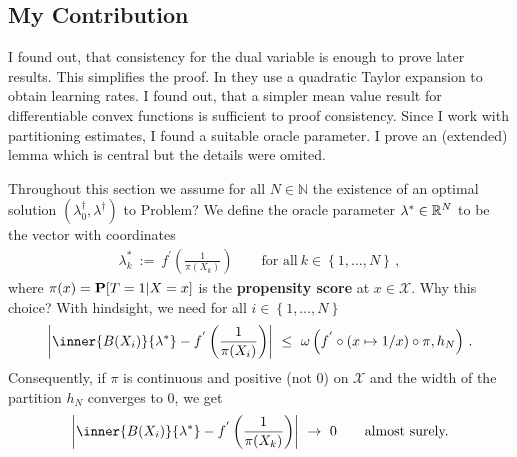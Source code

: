 \subsection*{My Contribution}
I found out, that consistency for the dual variable is enough to prove later results. This simplifies the proof. 
In \cite{Wang2019} they use a quadratic Taylor expansion to obtain learning rates. I found out, that a simpler mean value result for differentiable convex functions is sufficient to proof consistency. 
Since I work with partitioning estimates, I found a suitable oracle parameter.
I prove an (extended) lemma which is central but the details were omited.

Throughout this section we assume for all $N\in\mathbb{N}$ the existence of an 
optimal solution 
$(\lambda_0^\dagger,\lambda^\dagger)$
to Problem?
We define the oracle parameter $\lambda^*\in\R^N$ to be the vector with coordinates
\begin{gather}
  \label{oracle_1}
  \lambda^*_k
  \ 
  :=
  \ 
  f^{'}
  \left( 
    \frac{1}{\pi(X_k)}
  \right)
  \qquad
  \text{for all}\ 
  k\in \left\{ 1,\ldots,N \right\}
  \,,
\end{gather}
where $\pi(x)=\P[T=1|X=x]$ is the \textbf{propensity score} at $x\in\mathcal{X}$. Why this choice? 
With hindsight, we need
for all $i\in \left\{ 1,\ldots,N \right\}$
\begin{gather}
\left| 
\inner{B(X_i)}
{\lambda^*}
  -
  f^{'}
  \left( 
    \frac{1}{\pi(X_i)}
  \right)
\right|
\ 
\le
\ 
      \omega
      \left( f^{'}\circ (x\mapsto1/x)\circ \pi,h_N \right)
      \,.
\end{gather}
Consequently, if $\pi$ is continuous and positive (not 0) on $\mathcal{X}$ and the width of the partition $h_N$ converges to 0, we get 
\begin{gather}
 \left| 
  \inner{B(X_i)}{\lambda^*}
  -
  f^{'}
  \left( 
    \frac{1}{\pi(X_k)}
  \right)
 \right| 
 \
 \to
 \ 
 0
 \qquad
 \text{almost surely.}
\end{gather}
